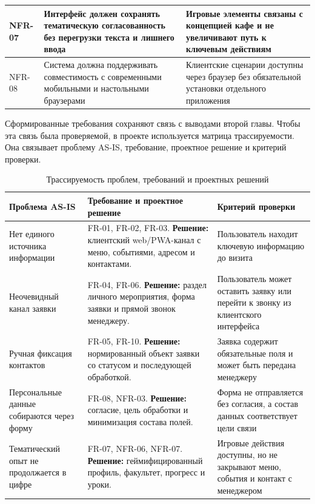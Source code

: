 \begin{table}[H]
\begin{tabularx}{\textwidth}{|>{\raggedright\arraybackslash}p{}|>{\raggedright\arraybackslash}p{}|>{\raggedright\arraybackslash}X|}
NFR-07 & Интерфейс должен сохранять тематическую согласованность без перегрузки текста и лишнего ввода & Игровые элементы связаны с концепцией кафе и не увеличивают путь к ключевым действиям \\ \hline
NFR-08 & Система должна поддерживать совместимость с современными мобильными и настольными браузерами & Клиентские сценарии доступны через браузер без обязательной установки отдельного приложения \\ \hline
\end{tabularx}
\normalsize
\end{table}

Сформированные требования сохраняют связь с выводами второй главы. Чтобы эта связь была проверяемой, в проекте используется матрица трассируемости. Она связывает проблему AS-IS, требование, проектное решение и критерий проверки.

\begin{table}[H]
\centering
\small
\caption{Трассируемость проблем, требований и проектных решений}
\label{tab:ch3_requirements_traceability}
\begin{tabularx}{\textwidth}{|>{\raggedright\arraybackslash}p{}|>{\raggedright\arraybackslash}p{}|>{\raggedright\arraybackslash}X|}
\hline
\textbf{Проблема AS-IS} & \textbf{Требование и проектное решение} & \textbf{Критерий проверки} \\ \hline
Нет единого источника информации & FR-01, FR-02, FR-03. \newline \textbf{Решение:} клиентский web/PWA-канал с меню, событиями, адресом и контактами. & Пользователь находит ключевую информацию до визита \\ \hline
Неочевидный канал заявки & FR-04, FR-06. \newline \textbf{Решение:} раздел личного мероприятия, форма заявки и прямой звонок менеджеру. & Пользователь может оставить заявку или перейти к звонку из клиентского интерфейса \\ \hline
Ручная фиксация контактов & FR-05, FR-10. \newline \textbf{Решение:} нормированный объект заявки со статусом и последующей обработкой. & Заявка содержит обязательные поля и может быть передана менеджеру \\ \hline
Персональные данные собираются через форму & FR-08, NFR-03. \newline \textbf{Решение:} согласие, цель обработки и минимизация состава полей. & Форма не отправляется без согласия, а состав данных соответствует цели связи \\ \hline
Тематический опыт не продолжается в цифре & FR-07, NFR-06, NFR-07. \newline \textbf{Решение:} геймифицированный профиль, факультет, прогресс и уроки. & Игровые действия доступны, но не закрывают меню, события и контакт с менеджером \\ \hline
\end{tabularx}
\normalsize
\end{table}

